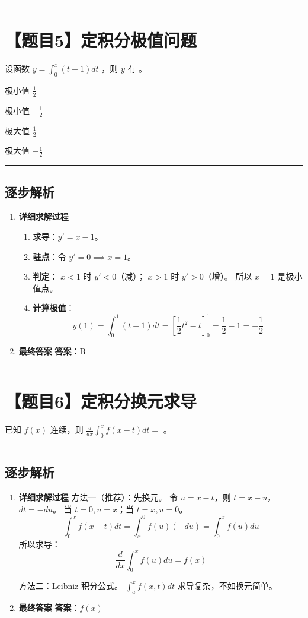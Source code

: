 \documentclass[UTF8]{ctexart}
\newenvironment{redenv}{\color{red}}{}
\newenvironment{detailedanalysis}{%
    \color{red}
    \begin{enumerate}[label=\textbf{第\arabic*步：}, leftmargin=*, align=left, itemsep=1.5ex]
}{%
    \end{enumerate}
}
\newcommand{\problemrule}{\noindent\rule{\textwidth}{1.5pt}\vspace{-0.8em}}
\newcommand{\analysisrule}{\noindent\rule{\textwidth}{0.8pt}\vspace{-0.8em}}
\newcommand{\choicesFour}[4]{
    \begin{enumerate}[label=\Alph*., itemsep=0pt, parsep=0pt, topsep=5pt, labelsep=0.5em]
        \begin{minipage}{0.22\linewidth} \item #1 \end{minipage}
        \begin{minipage}{0.22\linewidth} \item #2 \end{minipage}
        \begin{minipage}{0.22\linewidth} \item #3 \end{minipage}
        \begin{minipage}{0.22\linewidth} \item #4 \end{minipage}
    \end{enumerate}
}
\newcommand{\blank}[1]{\underline{\hspace{#1}}}
\begin{document}
\problemrule
\section*{【题目5】定积分极值问题}
设函数 $ y = \int_{0}^{x} (t - 1) dt $ ，则 $y$ 有 \blank{1cm}。
\choicesFour{极小值 $ \frac{1}{2} $}{极小值 $ -\frac{1}{2} $}{极大值 $ \frac{1}{2} $}{极大值 $ -\frac{1}{2} $}

\begin{redenv}
\analysisrule
\subsection*{逐步解析}

\begin{detailedanalysis}
\item \textbf{详细求解过程}
\begin{enumerate}[label=(\arabic*)]
\item \textbf{求导}：$y' = x - 1$。
\item \textbf{驻点}：令 $y'=0 \implies x=1$。
\item \textbf{判定}：
$x < 1$ 时 $y' < 0$（减）；
$x > 1$ 时 $y' > 0$（增）。
所以 $x=1$ 是极小值点。
\item \textbf{计算极值}：
$$ y(1) = \int_0^1 (t-1) dt = [\frac{1}{2}t^2 - t]_0^1 = \frac{1}{2} - 1 = -\frac{1}{2} $$
\end{enumerate}

\item \textbf{最终答案}
\textbf{答案}：B
\end{detailedanalysis}
\end{redenv}

\problemrule
\section*{【题目6】定积分换元求导}
已知 $ f(x) $ 连续，则 $ \frac{d}{dx} \int_{0}^{x} f(x - t) dt = $ \blank{2cm}。

\begin{redenv}
\analysisrule
\subsection*{逐步解析}

\begin{detailedanalysis}
\item \textbf{详细求解过程}
方法一（推荐）：先换元。
令 $u = x-t$，则 $t=x-u$，$dt = -du$。
当 $t=0, u=x$；当 $t=x, u=0$。
$$ \int_0^x f(x-t) dt = \int_x^0 f(u) (-du) = \int_0^x f(u) du $$
所以求导：
$$ \frac{d}{dx} \int_0^x f(u) du = f(x) $$

方法二：Leibniz 积分公式。
$\int_a^x f(x,t) dt$ 求导复杂，不如换元简单。

\item \textbf{最终答案}
\textbf{答案}：$ f(x) $
\end{detailedanalysis}
\end{redenv}
\end{document}
